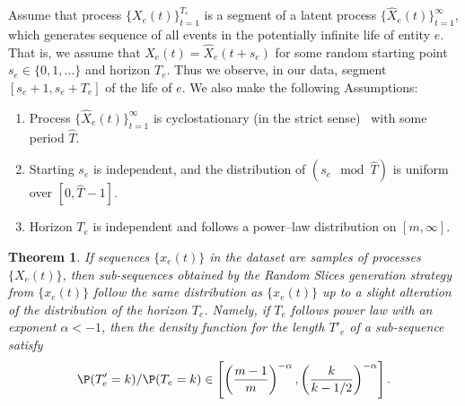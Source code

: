 \documentclass{article}
\newtheorem{thm}{Theorem}
\begin{document}
Assume that process $\{X_e(t)\}_{t=1}^{T_e}$ is a segment of a latent process $\{\widehat{X}_e(t)\}_{t=1}^{\infty}$, which generates sequence of all events in the potentially infinite life of entity $e$. That is, we assume that $X_e(t)=\widehat{X}_e(t+s_e)$ for some random starting point $s_e\in \{0,1,\ldots\}$ and horizon $T_e$. Thus we observe, in our data, segment $[s_e+1,s_e+T_e]$ of the life of $e$. We also make the following Assumptions:
\begin{enumerate}
    \item Process $\{\widehat{X}_e(t)\}_{t=1}^{\infty}$ is cyclostationary (in the strict sense)~\cite{Gardner2006Cyclostationarity} with some period $\widehat{T}$.
    \item Starting $s_e$ is independent, and the distribution of $(s_e \mod \widehat{T})$ is uniform over $[0,\widehat{T}-1]$.
    \item Horizon $T_e$ is independent and follows a power--law distribution on $[m,\infty]$.
\end{enumerate}
\begin{thm}
If sequences $\{x_e(t)\}$ in the dataset are samples of processes $\{X_e(t)\}$, then sub-sequences obtained by the Random Slices generation strategy from $\{x_e(t)\}$ follow the same distribution as $\{x_e(t)\}$ up to a slight alteration of the distribution of the horizon $T_e$. Namely, if $T_e$ follows power law with an exponent $\alpha <-1$, then the density function for the length $T'_e$ of a sub-sequence satisfy 
\begin{equation}\label{probability_ratio}
\P(T'_e=k)/\P(T_e=k)\in \left [\left (\frac{m-1}{m}\right )^{-\alpha},\left (\frac{k}{k-1/2}\right )^{-\alpha}\right ].    
\end{equation}

\end{thm}
\end{document}
